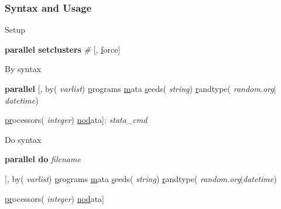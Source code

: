 \documentclass[9pt,\ExtraDocOpts]{beamer}
\begin{document}
\begin{frame}
\frametitle{Syntax and Usage}

Setup

\begin{semiverbatim}
\footnotesize
{\bf parallel setclusters} \textit{\#}  [, \uline{f}orce] 
\end{semiverbatim}\pause{}

By syntax

\begin{semiverbatim}
\footnotesize
{\bf parallel} [, by(\textit{\color{blue} varlist}) \uline{p}rograms \uline{m}ata \uline{s}eeds(\textit{\color{blue} string}) \uline{r}andtype(\textit{\color{blue} random.org$|$datetime})

\hspace{1cm} \uline{pr}ocessors(\textit{\color{blue} integer}) \uline{nod}ata]:  \textit{stata\_cmd}
\end{semiverbatim}\pause{}

Do syntax

\begin{semiverbatim}
\footnotesize
{\bf parallel do} \textit{\color{blue} filename}

\hspace{1cm} [, by(\textit{\color{blue} varlist}) \uline{p}rograms \uline{m}ata \uline{s}eeds(\textit{\color{blue} string}) \uline{r}andtype(\textit{\color{blue} random.org$|$datetime})

\hspace{1cm} \uline{pr}ocessors(\textit{\color{blue} integer}) \uline{nod}ata]
\end{semiverbatim}

\end{frame}
\end{document}
